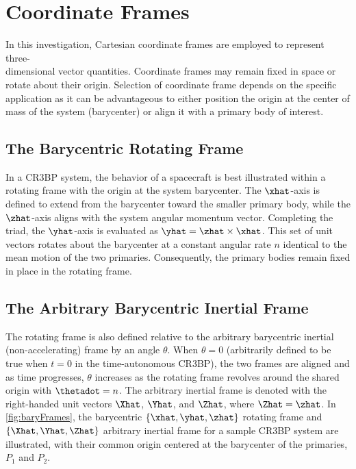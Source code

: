 \section{Coordinate Frames}\label{sec:CoordinateFrames}
In this investigation, Cartesian coordinate frames are employed to represent three-\\dimensional
vector quantities. Coordinate frames may remain fixed in space or rotate about their origin.
Selection of coordinate frame depends on the specific application as it can be advantageous to
either position the origin at the center of mass of the system (barycenter) or align it with a
primary body of interest.

\subsection{The Barycentric Rotating Frame}
In a CR3BP system, the behavior of a spacecraft is best illustrated within a rotating frame with
the origin at the system barycenter. The $\xhat$-axis is defined to extend from the barycenter
toward the smaller primary body, while the $\zhat$-axis aligns with the system angular momentum
vector. Completing the triad, the $\yhat$-axis is evaluated as $\yhat=\zhat\times\xhat$. This set
of unit vectors rotates about the barycenter at a constant angular rate $n$ identical to the mean
motion of the two primaries. Consequently, the primary bodies remain fixed in place in the
rotating frame.

\subsection{The Arbitrary Barycentric Inertial Frame}
The rotating frame is also defined relative to the arbitrary barycentric inertial
(non-accelerating) frame by an angle $\theta$. When $\theta=0$ (arbitrarily defined to be true when
$t=0$ in the time-autonomous CR3BP), the two frames are aligned and as time progresses, $\theta$
increases as the rotating frame revolves around the shared origin with $\thetadot=n$. The arbitrary
inertial frame is denoted with the right-handed unit vectors $\Xhat$, $\Yhat$, and $\Zhat$, where
$\Zhat=\zhat$. In \cref{fig:baryFrames}, the barycentric $\{\xhat,\yhat,\zhat\}$ rotating frame and
$\{\Xhat,\Yhat,\Zhat\}$ arbitrary inertial frame for a sample CR3BP system are illustrated, with
their common origin centered at the barycenter of the primaries, $P_{1}$ and $P_{2}$.

